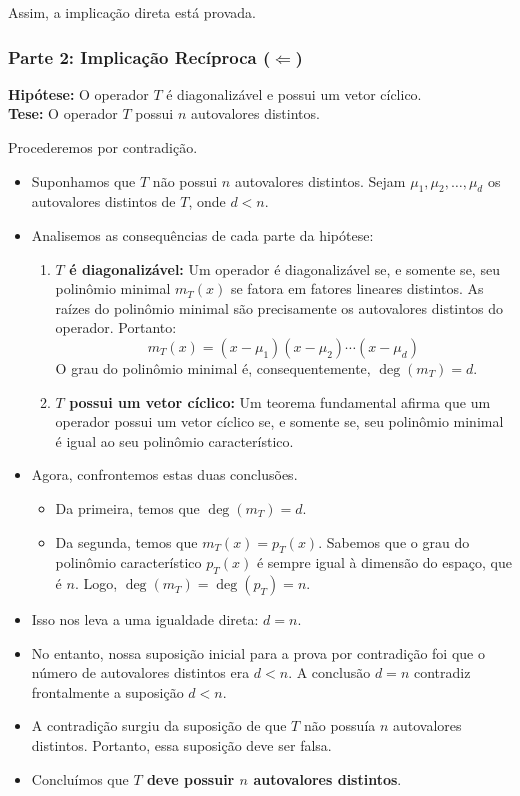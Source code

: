 Assim, a implicação direta está provada.

\subsubsection*{Parte 2: Implicação Recíproca ($\Leftarrow$)}

\textbf{Hipótese:} O operador $T$ é diagonalizável e possui um vetor cíclico. \\

\textbf{Tese:} O operador $T$ possui $n$ autovalores distintos.

Procederemos por contradição.
\begin{itemize}
    \item Suponhamos que $T$ não possui $n$ autovalores distintos. Sejam $\mu_1, \mu_2, \ldots, \mu_d$
    os autovalores distintos de $T$, onde $d < n$.
    \item Analisemos as consequências de cada parte da hipótese:
    \begin{enumerate}
        \item \textbf{$T$ é diagonalizável:} Um operador é diagonalizável se, e somente se, seu polinômio
        minimal $m_T(x)$ se fatora em fatores lineares distintos. As raízes do polinômio minimal são
        precisamente os autovalores distintos do operador. Portanto:
        \[
            m_T(x) = (x - \mu_1)(x - \mu_2)\cdots(x - \mu_d)
        \]
        O grau do polinômio minimal é, consequentemente, $\deg(m_T) = d$.
        \item \textbf{$T$ possui um vetor cíclico:} Um teorema fundamental afirma que um operador possui
        um vetor cíclico se, e somente se, seu polinômio minimal é igual ao seu polinômio
        característico.
    \end{enumerate}
    \item Agora, confrontemos estas duas conclusões.
    \begin{itemize}
        \item Da primeira, temos que $\deg(m_T) = d$.
        \item Da segunda, temos que $m_T(x) = p_T(x)$. Sabemos que o grau do polinômio característico
        $p_T(x)$ é sempre igual à dimensão do espaço, que é $n$. Logo, $\deg(m_T) = \deg(p_T) = n$.
    \end{itemize}
    \item Isso nos leva a uma igualdade direta: $d = n$.
    \item No entanto, nossa suposição inicial para a prova por contradição foi que o número de
    autovalores distintos era $d < n$. A conclusão $d = n$ contradiz frontalmente a suposição
    $d < n$.
    \item A contradição surgiu da suposição de que $T$ não possuía $n$ autovalores distintos. Portanto,
    essa suposição deve ser falsa.
    \item Concluímos que \textbf{$T$ deve possuir $n$ autovalores distintos}.
\end{itemize}

